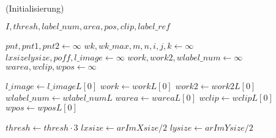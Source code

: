 \begin{algorithm}[htb]
\caption{ (Initialisierung)}
\label{alg:arlabeling-init1}
\begin{algorithmic}[1]
	\Require $I,\mathit{thresh},\mathit{label\_num},\mathit{area},\mathit{pos},\mathit{clip},\mathit{label\_ref}$

	\State $\mathit{pnt}, \mathit{pnt1}, \mathit{pnt2} \gets \infty$
	\label{alg:arlabeling-init1-local-start}
	\State $\mathit{wk}, \mathit{wk\_max}, m, n, i, j, k \gets \infty$
	\State $\mathit{lxsize}	\mathit{lysize}, \mathit{poff}, \mathit{l\_image} \gets \infty$
	\State $\mathit{work}, \mathit{work2}, \mathit{wlabel\_num} \gets \infty$
	\State $\mathit{warea}, \mathit{wclip}, \mathit{wpos} \gets \infty$
	\label{alg:arlabeling-init1-local-end}

	\State $\mathit{l\_image} \gets \mathit{l\_imageL}[0]$
	\label{alg:arlabeling-init1-address-start}
	\State $\mathit{work} \gets \mathit{workL}[0]$
	\State $\mathit{work2} \gets \mathit{work2L}[0]$
	\State $\mathit{wlabel\_num} \gets \mathit{wlabel\_numL}$
	\State $\mathit{warea} \gets \mathit{wareaL}[0]$
	\State $\mathit{wclip} \gets \mathit{wclipL}[0]$
	\State $\mathit{wpos} \gets \mathit{wposL}[0]$
	\label{alg:arlabeling-init1-address-end}

	\State $\mathit{thresh} \gets \mathit{thresh} \cdot 3$
	\label{alg:arlabeling-init1-threshold}
	\State $\mathit{lxsize} \gets \mathit{arImXsize}/2 $
	\label{alg:arlabeling-init1-size-start}
	\State $\mathit{lysize} \gets \mathit{arImYsize}/2 $
	\label{alg:arlabeling-init1-size-end}

\end{algorithmic}
\end{algorithm}
